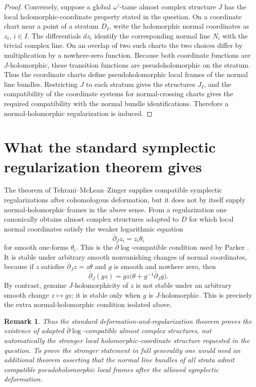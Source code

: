 \documentclass[11pt]{article}
\newtheorem{remark}[theorem]{Remark}
\begin{document}
\begin{proof}
Conversely, suppose a global \(\omega'\)-tame almost complex structure \(J\)
has the local holomorphic-coordinate property stated in the question.  On a
coordinate chart near a point of a stratum \(D_I\), write the holomorphic
normal coordinates as \(z_i\), \(i\in I\).  The differentials \(dz_i\) identify
the corresponding normal line \(N_i\) with the trivial complex line.  On an
overlap of two such charts the two choices differ by multiplication by a
nowhere-zero function.  Because both coordinate functions are
\(J\)-holomorphic, these transition functions are pseudoholomorphic on the
stratum.  Thus the coordinate charts define pseudoholomorphic local frames of
the normal line bundles.  Restricting \(J\) to each stratum gives the
structures \(J_I\), and the compatibility of the coordinate systems for
normal-crossing charts gives the required compatibility with the normal bundle
identifications.  Therefore a normal-holomorphic regularization is induced.
\end{proof}

\section{What the standard symplectic regularization theorem gives}

The theorem of Tehrani--McLean--Zinger supplies compatible symplectic
regularizations after cohomologous deformation, but it does not by itself
supply normal-holomorphic frames in the above sense.  From a regularization one
canonically obtains almost complex structures adapted to \(D\) for which local
normal coordinates satisfy the weaker logarithmic equation
\[
        \bar\partial_J z_i = z_i\theta_i
\]
for smooth one-forms \(\theta_i\).  This is the
\(\bar\partial\log\)-compatible condition used by Parker
\cite[Definition 14.5]{Parker}.  It is stable under arbitrary smooth
nonvanishing changes of normal coordinates, because if \(z\) satisfies
\(\bar\partial_J z=z\theta\) and \(g\) is smooth and nowhere zero, then
\[
        \bar\partial_J(gz)
        = gz\bigl(\theta+g^{-1}\bar\partial_J g\bigr).
\]
By contrast, genuine \(J\)-holomorphicity of \(z\) is not stable under an
arbitrary smooth change \(z\mapsto gz\); it is stable only when \(g\) is
\(J\)-holomorphic.  This is precisely the extra normal-holomorphic condition
isolated above.

\begin{remark}
Thus the standard deformation-and-regularization theorem proves the existence
of adapted \(\bar\partial\log\)-compatible almost complex structures, not
automatically the stronger local holomorphic-coordinate structure requested in
the question.  To prove the stronger statement in full generality one would
need an additional theorem asserting that the normal line bundles of all strata
admit compatible pseudoholomorphic local frames after the allowed symplectic
deformation.
\end{remark}
\end{document}
